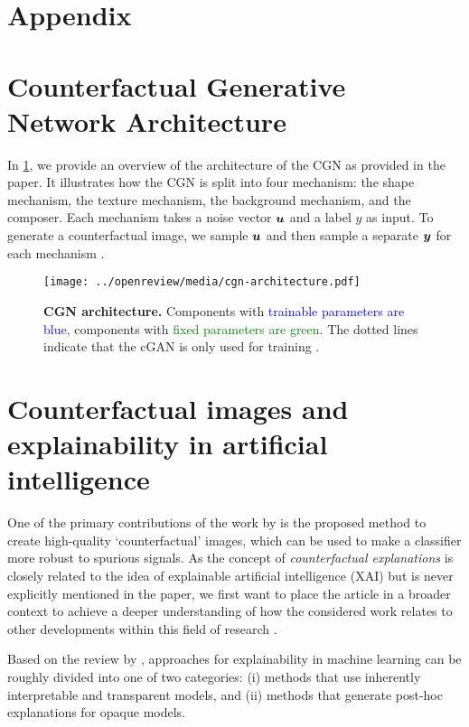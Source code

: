 \newpage

\appendix
\section*{Appendix}


\section{Counterfactual Generative Network Architecture} \label{sec:cgn-architecture}
In \cref{fig:cgn-architecture}, we provide an overview of the architecture of the CGN as provided in the paper. It illustrates how the CGN is split into four mechanism: the shape mechanism, the texture mechanism, the background mechanism, and the composer. Each mechanism takes a noise vector $\boldsymbol{u}$ and a label $y$ as input. To generate a counterfactual image, we sample $\boldsymbol{u}$ and then sample a separate $\boldsymbol{y}$ for each mechanism .

\begin{figure}[H]
    \centering
    \texttt{[image: ../openreview/media/cgn-architecture.pdf]}
    \caption{\textbf{CGN architecture.} Components with \textcolor{Blue}{trainable parameters are blue}, components with \textcolor{Green}{fixed parameters are green}. The dotted lines indicate that the cGAN is only used for training \cite{Sauer2021ICLR}.}
    \label{fig:cgn-architecture}
\end{figure}


\section{Counterfactual images and explainability in artificial intelligence} \label{sec:counterfactuals}
One of the primary contributions of the work by  is the proposed method to create high-quality `counterfactual' images, which can be used to make a classifier more robust to spurious signals. As the concept of \emph{counterfactual explanations} is closely related to the idea of explainable artificial intelligence (XAI) but is never explicitly mentioned in the paper, we first want to place the article in a broader context to achieve a deeper understanding of how the considered work relates to other developments within this field of research \cite{arrieta2020explainable}.

Based on the review by , approaches for explainability in machine learning can be roughly divided into one of two categories:
(i) methods that use inherently interpretable and transparent models, and (ii) methods that generate post-hoc explanations for opaque models.

